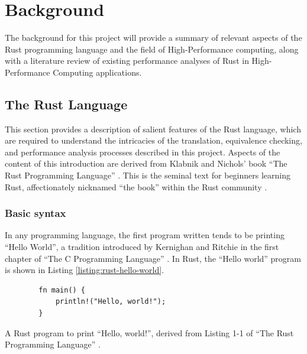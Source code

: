 \chapter{Background}
\label{ch:background}


The background for this project will provide a summary of relevant aspects of the Rust programming language and the field of High-Performance computing, along with a literature review of existing performance analyses of Rust in High-Performance Computing applications.


\section{The Rust Language}
\label{sec:rust}

This section provides a description of salient features of the Rust language, which are required to understand the intricacies of the translation, equivalence checking, and performance analysis processes described in this project. Aspects of the content of this introduction are derived from Klabnik and Nichols' book ``The Rust Programming Language'' \cite{RustProgrammingLanguage}. This is the seminal text for beginners learning Rust, affectionately nicknamed ``the book'' within the Rust community \cite{LearnRust}.

\subsection{Basic syntax}
\label{ssec:rust-syntax}

In any programming language, the first program written tends to be printing ``Hello World'', a tradition introduced by Kernighan and Ritchie in the first chapter of ``The C Programming Language'' \cite{kernighan2002c}. In Rust, the ``Hello world'' program is shown in Listing \ref{listing:rust-hello-world}.

\begin{code}
    \begin{verbatim}
        fn main() {
            println!("Hello, world!");
        }
    \end{verbatim}
    \caption{A Rust program to print ``Hello, world!'', derived from Listing 1-1 of ``The Rust Programming Language'' \cite{RustProgrammingLanguage}.}
    \label{listing:rust-hello-world}
\end{code}

